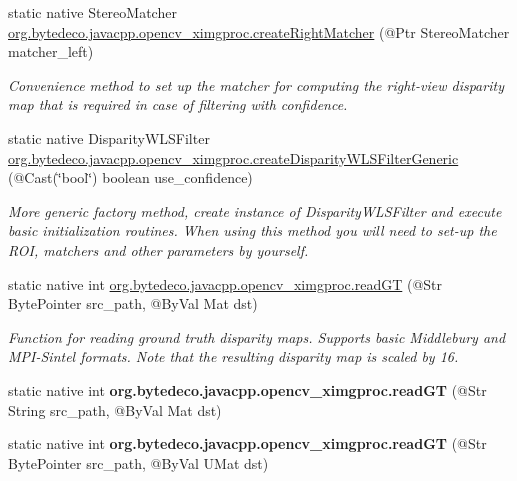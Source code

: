 \begin{DoxyCompactItemize}
static native Stereo\+Matcher \hyperlink{group__ximgproc__filters_ga8d41bef5e1e848d7fa4b163459e79499}{org.\+bytedeco.\+javacpp.\+opencv\+\_\+ximgproc.\+create\+Right\+Matcher} (@Ptr Stereo\+Matcher matcher\+\_\+left)
\begin{DoxyCompactList}\small\item\em Convenience method to set up the matcher for computing the right-\/view disparity map that is required in case of filtering with confidence. \end{DoxyCompactList}\item 
static native Disparity\+W\+L\+S\+Filter \hyperlink{group__ximgproc__filters_ga4ecf158eb4378bda624a77b7afe92c9b}{org.\+bytedeco.\+javacpp.\+opencv\+\_\+ximgproc.\+create\+Disparity\+W\+L\+S\+Filter\+Generic} (@Cast(\char`\"{}bool\char`\"{}) boolean use\+\_\+confidence)
\begin{DoxyCompactList}\small\item\em More generic factory method, create instance of Disparity\+W\+L\+S\+Filter and execute basic initialization routines. When using this method you will need to set-\/up the R\+OI, matchers and other parameters by yourself. \end{DoxyCompactList}\item 
static native int \hyperlink{group__ximgproc__filters_ga98c3c9fc13d0d1e808c73c8a0ae91a09}{org.\+bytedeco.\+javacpp.\+opencv\+\_\+ximgproc.\+read\+GT} (@Str Byte\+Pointer src\+\_\+path, @By\+Val Mat dst)
\begin{DoxyCompactList}\small\item\em Function for reading ground truth disparity maps. Supports basic Middlebury and M\+P\+I-\/\+Sintel formats. Note that the resulting disparity map is scaled by 16. \end{DoxyCompactList}\item 
\mbox{\label{group__ximgproc__filters_ga541e438604add32e839f57df1258e196}} 
static native int {\bfseries org.\+bytedeco.\+javacpp.\+opencv\+\_\+ximgproc.\+read\+GT} (@Str String src\+\_\+path, @By\+Val Mat dst)
\item 
\mbox{\label{group__ximgproc__filters_gacdffa9e4a509fc23c78c68e8cde3cf72}} 
static native int {\bfseries org.\+bytedeco.\+javacpp.\+opencv\+\_\+ximgproc.\+read\+GT} (@Str Byte\+Pointer src\+\_\+path, @By\+Val U\+Mat dst)
\item 
\mbox{\label{group__ximgproc__filters_ga114cba79bd753d17237eec2ba2964062}} 

\end{DoxyCompactItemize}
